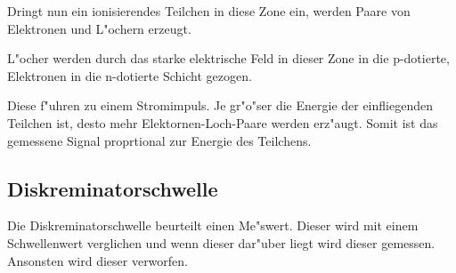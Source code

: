 Dringt nun ein ionisierendes Teilchen in diese Zone ein, werden Paare von Elektronen und L"ochern erzeugt.

L"ocher werden durch das starke elektrische Feld in dieser Zone in die p-dotierte, Elektronen in die n-dotierte Schicht gezogen.

Diese f"uhren zu einem Stromimpuls. Je gr"o"ser die Energie der einfliegenden Teilchen ist, desto mehr Elektornen-Loch-Paare werden erz"augt. Somit ist das gemessene Signal proprtional zur Energie des Teilchens.

\subsection{Diskreminatorschwelle} %
\label{sub:diskreminatorschwelle}

Die Diskreminatorschwelle beurteilt einen Me"swert. Dieser wird mit einem Schwellenwert verglichen und wenn dieser dar"uber liegt wird dieser gemessen. Ansonsten wird dieser verworfen.

\clearpage